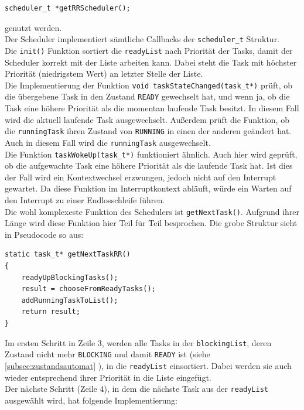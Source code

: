 \documentclass[fontsize=12pt, toc=bibliography, notitlepage]{scrreprt}
\newcommand{\refnn}[1]{\ref{#1} \nameref{#1}}
\begin{document}
\begin{lstlisting}[title=schedulerRR.h]
scheduler_t *getRRScheduler();
\end{lstlisting}

genutzt werden.\\
Der Scheduler implementiert sämtliche Callbacks der \lstinline$scheduler_t$ Struktur.\\
Die \lstinline$init()$ Funktion sortiert die \lstinline$readyList$ nach Priorität der Tasks, damit der Scheduler korrekt mit der Liste arbeiten kann. Dabei steht die Task mit höchster Priorität (niedrigstem Wert) an letzter Stelle der Liste.\\
Die Implementierung der Funktion \lstinline$void taskStateChanged(task_t*)$ prüft, ob die übergebene Task in den Zustand \lstinline$READY$ gewechselt hat, und wenn ja, ob die Task eine höhere Priorität als die momentan laufende Task besitzt. In diesem Fall wird die aktuell laufende Task ausgewechselt. Außerdem prüft die Funktion, ob die \lstinline$runningTask$ ihren Zustand von \lstinline$RUNNING$ in einen der anderen geändert hat. Auch in diesem Fall wird die \lstinline$runningTask$ ausgewechselt.\\
Die Funktion \lstinline$taskWokeUp(task_t*)$ funktioniert ähnlich. Auch hier wird geprüft, ob die aufgewachte Task eine höhere Priorität als die laufende Task hat. Ist dies der Fall wird ein Kontextwechsel erzwungen, jedoch nicht auf den Interrupt gewartet. Da diese Funktion im Interruptkontext abläuft, würde ein Warten auf den Interrupt zu einer Endlosschleife führen.\\
Die wohl komplexeste Funktion des Schedulers ist \lstinline$getNextTask()$. Aufgrund ihrer Länge wird diese Funktion hier Teil für Teil besprochen. Die grobe Struktur sieht in Pseudocode so aus:

\begin{lstlisting}
static task_t* getNextTaskRR()
{
	readyUpBlockingTasks();
	result = chooseFromReadyTasks();
	addRunningTaskToList();
	return result;
}
\end{lstlisting}

Im ersten Schritt in Zeile 3, werden alle Tasks in der \lstinline$blockingList$, deren Zustand nicht mehr \lstinline$BLOCKING$ und damit \lstinline$READY$ ist (siehe \refnn{subsec:zustandsautomat}), in die \lstinline$readyList$ einsortiert. Dabei werden sie auch wieder entsprechend ihrer Priorität in die Liste eingefügt.\\
Der nächste Schritt (Zeile 4), in dem die nächste Task aus der \lstinline$readyList$ ausgewählt wird, hat folgende Implementierung:
\end{document}
